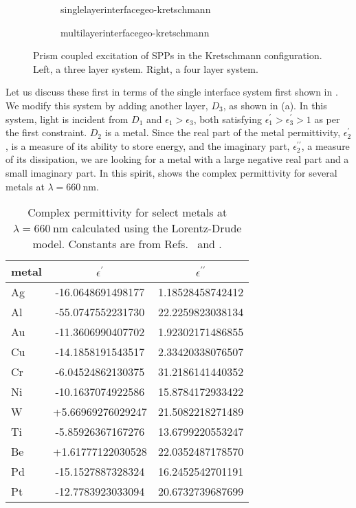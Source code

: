 \begin{figure}[ht]
 \centering
 \begin{subfigure}[b]{0.4\textwidth}
  \centering
  {singlelayerinterfacegeo-kretschmann}
 \end{subfigure}
 \begin{subfigure}[b]{0.4\textwidth}
  \centering
  {multilayerinterfacegeo-kretschmann}
 \end{subfigure}
\caption{Prism coupled excitation of SPPs in the Kretschmann configuration.
								Left, a three layer system.  Right, a four layer system. }
\label{fig:prismcoupledsetups}
\end{figure}
Let us discuss these first in terms of the single interface system
first shown in .  We modify this system by
adding another layer, $D_3$, as shown in
(a).  In this system, light is incident from
$D_1$ and $\epsilon_1>\epsilon_3$, both satisfying
$\epsilon^\prime_1>\epsilon^\prime_3>1$ as per the first constraint.  $D_2$
is a metal.  Since the real part of the metal permittivity,
$\epsilon_2^\prime$, is a measure of its ability to store energy, and the
imaginary part, $\epsilon_2^{\prime\prime}$, a measure of its dissipation,
we are looking for a metal with a large negative real part and a small
imaginary part.  In this spirit,  shows the complex
permittivity for several metals at $\lambda=\SI{660}{\nano\meter}$.

\begin{table}[ht]
\centering
{}
\begin{tabular}{lSS}
\toprule
metal & {$\epsilon^\prime$} & {$\epsilon^{\prime\prime}$} \\
\midrule
Ag & -16.0648691498177 & 1.18528458742412\\
Al & -55.0747552231730 & 22.2259823038134\\
Au & -11.3606990407702 & 1.92302171486855\\
Cu & -14.1858191543517 & 2.33420338076507\\
Cr & -6.04524862130375 & 31.2186141440352\\
Ni & -10.1637074922586 & 15.8784172933422\\
W  & +5.66969276029247 & 21.5082218271489\\
Ti & -5.85926367167276 & 13.6799220553247\\
Be & +1.61777122030528 & 22.0352487178570\\
Pd & -15.1527887328324 & 16.2452542701191\\
Pt & -12.7783923033094 & 20.6732739687699\\
\bottomrule
\end{tabular}
\caption{Complex permittivity for select metals at
$\lambda=\SI{660}{\nano\meter}$ calculated using the Lorentz-Drude
model.  Constants are from Refs.~\cite{ung2007interference} and
\cite{rakic1998optical}.}
	\label{tbl:epsmetal600}
\end{table}

